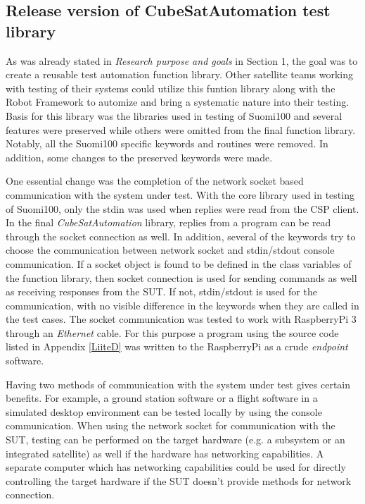 \documentclass[english,12pt,a4paper,pdftex,elec,utf8]{aaltothesis}
\begin{document}
\subsection{Release version of CubeSatAutomation test library}
As was already stated in \textit{Research purpose and goals} in Section 1, the goal was to create a reusable test automation function library. Other satellite teams working with testing of their systems could utilize this funtion library along with the Robot Framework to automize and bring a systematic nature into their testing. 
Basis for this library was the libraries used in testing of Suomi100 and several features were preserved while others were omitted from the final function library. Notably, all the Suomi100 specific keywords and routines were removed. In addition, some changes to the preserved keywords were made.\par 
One essential change was the completion of the network socket based communication with the system under test. With the core library used in testing of Suomi100, only the stdin was used when replies were read from the CSP client. In the final \textit{CubeSatAutomation} library, replies from a program can be read through the socket connection as well. In addition, several of the keywords try to choose the communication between network socket and stdin/stdout console communication. If a socket object is found to be defined in the class variables of the function library, then socket connection is used for sending commands as well as receiving responses from the SUT. If not, stdin/stdout is used for the communication, with no visible difference in the keywords when they are called in the test cases. The socket communication was tested to work with RaspberryPi 3 through an \textit{Ethernet} cable. For this purpose a program using the source code listed in Appendix \ref{LiiteD} was written to the RaspberryPi as a crude \textit{endpoint} software.  \par
Having two methods of communication with the system under test gives certain benefits. For example, a ground station software or a flight software in a simulated desktop environment can be tested locally by using the console communication. When using the network socket for communication with the SUT, testing can be performed on the target hardware (e.g. a subsystem or an integrated satellite) as well if the hardware has networking capabilities. A separate computer which has networking capabilities could be used for directly controlling the target hardware if the SUT doesn't provide methods for network connection. \par 
\end{document}
